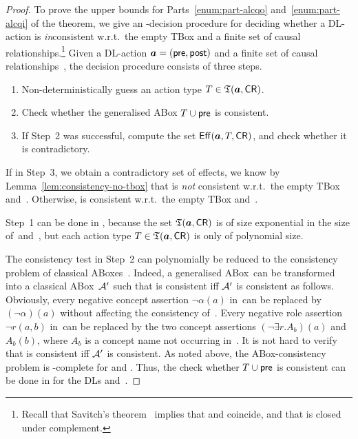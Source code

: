 \begin{proof}
    To prove the upper bounds for Parts~\ref{enum:part-alcqo}
    and~\ref{enum:part-alcqi} of the theorem, we give an \NPSpace-decision
    procedure for deciding whether a DL-action is \emph{in}consistent w.r.t.\
    the empty TBox and a finite set of causal relationships.\footnote{%
        Recall that Savitch's theorem~\cite{Sav-JCSS70} implies that \NPSpace
        and \PSpace coincide, and that \PSpace is closed under complement.}
    Given a DL-action $\boldsymbol a=(\mathsf{pre},\mathsf{post})$ and a finite set of causal
    relationships~\CR, the decision procedure consists of three steps.
    \begin{enumerate}
        \item Non-deterministically guess an action type $T\in\mathfrak{T}(\boldsymbol a,\mathsf{CR})$.
        \item Check whether the generalised ABox $T\cup\mathsf{pre}$ is consistent.
        \item If Step~2 was successful, compute the set $\operatorname{\mathsf{Eff}}(\boldsymbol a,T,\mathsf{CR})$, and
            check whether it is contradictory.
    \end{enumerate}
    If in Step~3, we obtain a contradictory set of effects, we know by
    Lemma~\ref{lem:consistency-no-tbox} that \abf is \emph{not} consistent
    w.r.t.\ the empty TBox and~\CR.  Otherwise, \abf is consistent w.r.t.\ the
    empty TBox and~\CR.

    Step~1 can be done in \PSpace, because the set $\mathfrak{T}(\boldsymbol a,\mathsf{CR})$ is of size
    exponential in the size of~\abf and~\CR, but each action type
    $T\in\mathfrak{T}(\boldsymbol a,\mathsf{CR})$ is only of polynomial size.

    The consistency test in Step~2 can polynomially be reduced to the
    consistency problem of classical ABoxes~\cite{BLM+-LTCS-05-02}.  Indeed, a
    generalised ABox~\Amc can be transformed into a classical ABox~$\mathcal{A}'$ such
    that \Amc is consistent iff $\mathcal{A}'$ is consistent as follows.  Obviously,
    every negative concept assertion $\lnot\alpha(a)$ in~\Amc can be replaced by
    $(\lnot\alpha)(a)$ without affecting the consistency of~\Amc.  Every
    negative role assertion $\lnot r(a,b)$ in~\Amc can be replaced by the two
    concept assertions $(\lnot\exists r.A_b)(a)$ and $A_b(b)$, where $A_b$ is a
    concept name not occurring in~\Amc.  It is not hard to verify that \Amc is
    consistent iff $\mathcal{A}'$ is consistent.  As noted above, the ABox-consistency
    problem is \PSpace-complete for \ALCQO and \ALCQI.  Thus, the check
    whether $T\cup\mathsf{pre}$ is consistent can be done in \PSpace for the DLs \ALCQO
    and~\ALCQI.


\end{proof}
